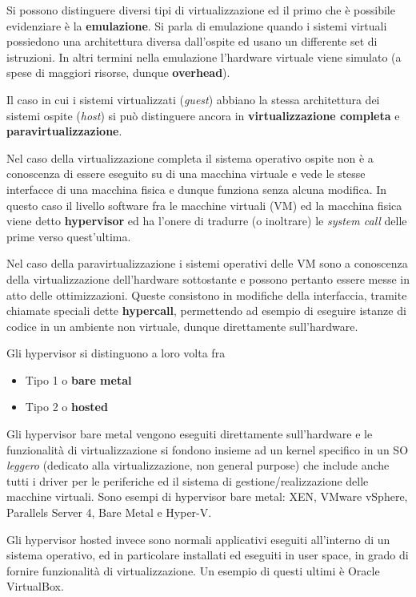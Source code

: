 \documentclass[italian,]{article}
\providecommand{\tightlist}{%
  \setlength{\itemsep}{0pt}\setlength{\parskip}{0pt}}
\begin{document}
Si possono distinguere diversi tipi di virtualizzazione ed il primo che
è possibile evidenziare è la \textbf{emulazione}. Si parla di emulazione
quando i sistemi virtuali possiedono una architettura diversa
dall'ospite ed usano un differente set di istruzioni. In altri termini
nella emulazione l'hardware virtuale viene simulato (a spese di maggiori
risorse, dunque \textbf{overhead}).

Il caso in cui i sistemi virtualizzati (\emph{guest}) abbiano la stessa
architettura dei sistemi ospite (\emph{host}) si può distinguere ancora
in \textbf{virtualizzazione completa} e \textbf{paravirtualizzazione}.

Nel caso della virtualizzazione completa il sistema operativo ospite non
è a conoscenza di essere eseguito su di una macchina virtuale e vede le
stesse interfacce di una macchina fisica e dunque funziona senza alcuna
modifica. In questo caso il livello software fra le macchine virtuali
(VM) ed la macchina fisica viene detto \textbf{hypervisor} ed ha l'onere
di tradurre (o inoltrare) le \emph{system call} delle prime verso
quest'ultima.

Nel caso della paravirtualizzazione i sistemi operativi delle VM sono a
conoscenza della virtualizzazione dell'hardware sottostante e possono
pertanto essere messe in atto delle ottimizzazioni. Queste consistono in
modifiche della interfaccia, tramite chiamate speciali dette
\textbf{hypercall}, permettendo ad esempio di eseguire istanze di codice
in un ambiente non virtuale, dunque direttamente sull'hardware.

Gli hypervisor si distinguono a loro volta fra

\begin{itemize}
\tightlist
\item
  Tipo 1 o \textbf{bare metal}
\item
  Tipo 2 o \textbf{hosted}
\end{itemize}

Gli hypervisor bare metal vengono eseguiti direttamente sull'hardware e
le funzionalità di virtualizzazione si fondono insieme ad un kernel
specifico in un SO \emph{leggero} (dedicato alla virtualizzazione, non
general purpose) che include anche tutti i driver per le periferiche ed
il sistema di gestione/realizzazione delle macchine virtuali. Sono
esempi di hypervisor bare metal: XEN, VMware vSphere, Parallels Server
4, Bare Metal e Hyper-V.

Gli hypervisor hosted invece sono normali applicativi eseguiti
all'interno di un sistema operativo, ed in particolare installati ed
eseguiti in user space, in grado di fornire funzionalità di
virtualizzazione. Un esempio di questi ultimi è Oracle VirtualBox.
\end{document}
